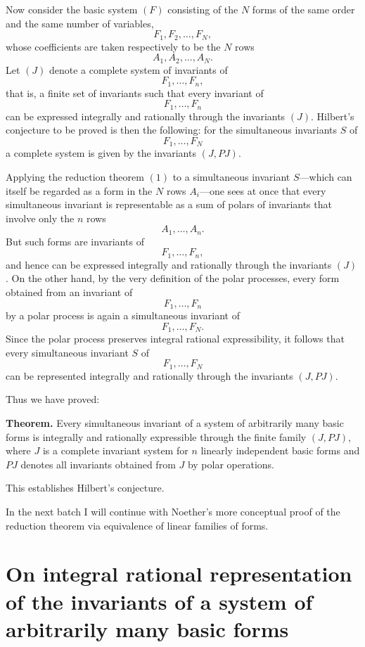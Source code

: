 \documentclass[11pt]{article}
\begin{document}
Now consider the basic system \((F)\) consisting of the \(N\) forms of the same order and the same number of variables,
\[
F_1,F_2,\dots,F_N,
\]
whose coefficients are taken respectively to be the \(N\) rows
\[
A_1,A_2,\dots,A_N.
\]
Let \((J)\) denote a complete system of invariants of
\[
F_1,\dots,F_n,
\]
that is, a finite set of invariants such that every invariant of
\[
F_1,\dots,F_n
\]
can be expressed integrally and rationally through the invariants \((J)\). Hilbert's conjecture to be proved is then the following: for the simultaneous invariants \(S\) of
\[
F_1,\dots,F_N
\]
a complete system is given by the invariants \((J,PJ)\).

Applying the reduction theorem \((1)\) to a simultaneous invariant \(S\)---which can itself be regarded as a form in the \(N\) rows \(A_i\)---one sees at once that every simultaneous invariant is representable as a sum of polars of invariants that involve only the \(n\) rows
\[
A_1,\dots,A_n.
\]
But such forms are invariants of
\[
F_1,\dots,F_n,
\]
and hence can be expressed integrally and rationally through the invariants \((J)\). On the other hand, by the very definition of the polar processes, every form obtained from an invariant of
\[
F_1,\dots,F_n
\]
by a polar process is again a simultaneous invariant of
\[
F_1,\dots,F_N.
\]
Since the polar process preserves integral rational expressibility, it follows that every simultaneous invariant \(S\) of
\[
F_1,\dots,F_N
\]
can be represented integrally and rationally through the invariants \((J,PJ)\).

Thus we have proved:

\medskip
\noindent\textbf{Theorem.}
Every simultaneous invariant of a system of arbitrarily many basic forms is integrally and rationally expressible through the finite family \((J,PJ)\), where \(J\) is a complete invariant system for \(n\) linearly independent basic forms and \(PJ\) denotes all invariants obtained from \(J\) by polar operations.

\medskip
This establishes Hilbert's conjecture.

\bigskip
\noindent In the next batch I will continue with Noether's more conceptual proof of the reduction theorem via equivalence of linear families of forms.

\clearpage
\section*{On integral rational representation of the invariants of a system of arbitrarily many basic forms}
\end{document}
